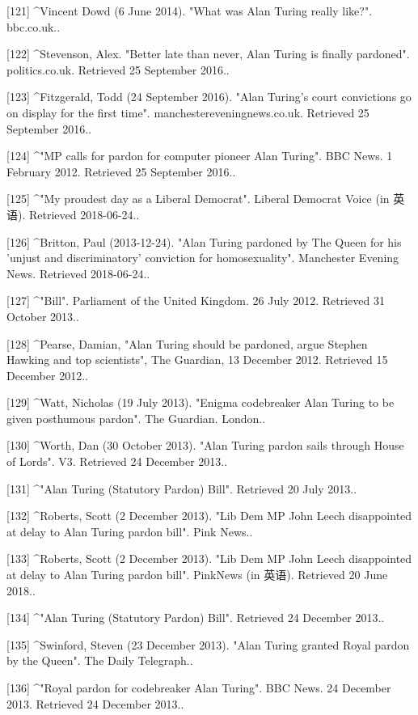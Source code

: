 [121]
^Vincent Dowd (6 June 2014). "What was Alan Turing really like?". bbc.co.uk..

[122]
^Stevenson, Alex. "Better late than never, Alan Turing is finally pardoned". politics.co.uk. Retrieved 25 September 2016..

[123]
^Fitzgerald, Todd (24 September 2016). "Alan Turing's court convictions go on display for the first time". manchestereveningnews.co.uk. Retrieved 25 September 2016..

[124]
^"MP calls for pardon for computer pioneer Alan Turing". BBC News. 1 February 2012. Retrieved 25 September 2016..

[125]
^"My proudest day as a Liberal Democrat". Liberal Democrat Voice (in 英语). 
Retrieved 2018-06-24..

[126]
^Britton, Paul (2013-12-24). "Alan Turing pardoned by The Queen for his 'unjust and discriminatory' conviction for homosexuality". Manchester Evening News. Retrieved 2018-06-24..

[127]
^"Bill". Parliament of the United Kingdom. 26 July 2012. Retrieved 31 October 2013..

[128]
^Pearse, Damian, "Alan Turing should be pardoned, argue Stephen Hawking and top scientists", The Guardian, 13 December 2012. Retrieved 15 December 2012..

[129]
^Watt, Nicholas (19 July 2013). "Enigma codebreaker Alan Turing to be given posthumous pardon". The Guardian. London..

[130]
^Worth, Dan (30 October 2013). "Alan Turing pardon sails through House of Lords". V3. Retrieved 24 December 2013..

[131]
^"Alan Turing (Statutory Pardon) Bill". Retrieved 20 July 2013..

[132]
^Roberts, Scott (2 December 2013). "Lib Dem MP John Leech disappointed at delay to Alan Turing pardon bill". Pink News..

[133]
^Roberts, Scott (2 December 2013). "Lib Dem MP John Leech disappointed at delay to Alan Turing pardon bill". PinkNews (in 英语). Retrieved 20 June 2018..

[134]
^"Alan Turing (Statutory Pardon) Bill". Retrieved 24 December 2013..

[135]
^Swinford, Steven (23 December 2013). "Alan Turing granted Royal pardon by the Queen". The Daily Telegraph..

[136]
^"Royal pardon for codebreaker Alan Turing". BBC News. 24 December 2013. Retrieved 24 December 2013..

